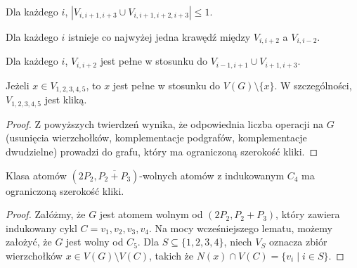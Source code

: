 \documentclass[polish]{beamer}
\begin{document}
\begin{frame}
    \begin{theorem}
        \renewcommand{\qedsymbol}{}
        Dla każdego $i$, $|V_{i,i+1,i+3} \cup V_{i,i+1,i+2,i+3}| \leq 1$.
    \end{theorem}
    \graphBigger
\end{frame}

\begin{frame}
    \begin{theorem}
        \renewcommand{\qedsymbol}{}
        Dla każdego $i$ istnieje co najwyżej jedna krawędź między $V_{i,i+2}$ a $V_{i,i-2}$.
    \end{theorem}
    \graphBigger
\end{frame}

\begin{frame}
    \begin{theorem}
        \renewcommand{\qedsymbol}{}
        Dla każdego $i$, $V_{i,i+2}$ jest pełne w stosunku do $V_{i-1,i+1} \cup V_{i+1,i+3}$.
    \end{theorem}
    \graphBigger
\end{frame}

\begin{frame}
    \begin{theorem}
        \renewcommand{\qedsymbol}{}
        Jeżeli $x \in V_{1,2,3,4,5}$, to $x$ jest pełne w stosunku do $V(G) \setminus \{x\}$. W szczególności, $V_{1,2,3,4,5}$ jest kliką.
    \end{theorem}
    \graphBigger
\end{frame}

\begin{frame}
    \begin{proof}      
        Z powyższych twierdzeń wynika, że odpowiednia liczba operacji na $G$ (usunięcia wierzchołków, komplementacje podgrafów, komplementacje dwudzielne) prowadzi do grafu, który ma ograniczoną szerokość kliki.
        \end{proof}
\end{frame}

\begin{frame}
    \begin{lemma}
        Klasa atomów $(2P_2, \overline{P_2 + P_3})$-wolnych atomów z indukowanym $C_4$ ma ograniczoną szerokość kliki.
    \end{lemma}
    \begin{proof}
        \renewcommand{\qedsymbol}{}
        Załóżmy, że $G$ jest atomem wolnym od $(2P_2, P_2 + P_3)$, który zawiera indukowany cykl $C = v_1, v_2, v_3, v_4$. Na mocy wcześniejszego lematu, możemy założyć, że $G$ jest wolny od $C_5$. Dla $S \subseteq \{1, 2, 3, 4\}$, niech $V_S$ oznacza zbiór wierzchołków $x \in V(G) \setminus V(C)$, takich że $N(x) \cap V(C) = \{v_i \mid i \in S\}$.
    \end{proof}
\end{frame}
\end{document}
